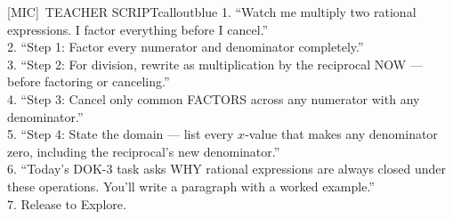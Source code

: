 \documentclass[11pt]{article}
\newcommand{\IconMic}{[MIC]}
\begin{document}
\begin{callout}{\IconMic\ TEACHER SCRIPT}{calloutblue}
1. “Watch me multiply two rational expressions. I factor everything before I cancel.”\\
2. “Step 1: Factor every numerator and denominator completely.”\\
3. “Step 2: For division, rewrite as multiplication by the reciprocal NOW — before factoring or canceling.”\\
4. “Step 3: Cancel only common FACTORS across any numerator with any denominator.”\\
5. “Step 4: State the domain — list every \(x\)-value that makes any denominator zero, including the reciprocal’s new denominator.”\\
6. “Today’s DOK-3 task asks WHY rational expressions are always closed under these operations. You’ll write a paragraph with a worked example.”\\
7. Release to Explore.
\end{callout}
\end{document}
